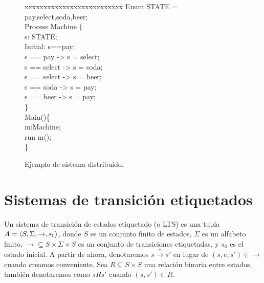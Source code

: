 \begin{figure}[t]
\begin{minipage}[t]{.47\textwidth}
\fontsize{6.6}{6.6}\selectfont\ttfamily
\begin{tabbing}
x\=xxxxxxxx\=xxxxxxxxxxxx\=xx\=xxx\= \kill
Enum STATE = {pay,select,soda,beer}; \\[1ex]

Process Machine \{\\[1ex]
\>s: STATE; \\
\>Initial: s==pay;\\[1ex]

\>[insertCoin] s == pay -> s = select; \\
\>[choose] s == select -> s = soda; \\
\>[choose] s == select -> s = beer; \\
\>[getSoda] s == soda -> s = pay; \\
\>[getBeer] s == beer -> s = pay; \\
\} \\[1ex]

Main()\{\\[1ex]
\>m:Machine; \\
\>run m(); \\
\}\\
\end{tabbing}
\end{minipage}
\hfill
\vspace{-0.5cm}
\caption{Ejemplo de sistema distribuido.} \label{fig:exam_language2}
\vspace{-0.5cm}
\end{figure}
\fi


\section{Sistemas de transición etiquetados}
Un sistema de transición de estados etiquetado (o LTS) es una tupla $A =\langle S, \Sigma, \rightarrow, s_0 \rangle$, donde $S$ es un conjunto finito de estados, $\Sigma$ es un alfabeto finito,  $\rightarrow \subseteq S \times \Sigma \times S$ es un conjunto de transiciones etiquetadas, y $s_0$ es el estado inicial. A partir de ahora, denotaremos $s \xrightarrow{e} s'$ en lugar de $(s,e,s') \in \rightarrow$ cuando creamos conveniente. Sea $R \subseteq S \times S$ una relación binaria entre estados, también denotaremos como $sRs'$ cuando $(s,s') \in R$.

